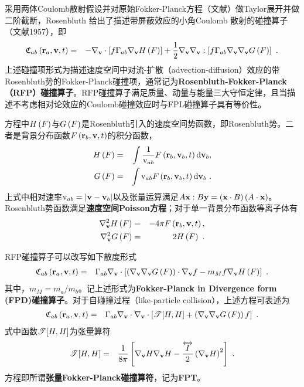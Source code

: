   采用两体Coulomb散射假设并对原始Fokker-Planck方程（文献）做Taylor展开并做二阶截断，Rosenbluth 给出了描述带屏蔽效应的小角Coulomb 散射的碰撞算子（文献1957），即
  \begin{eqnarray}
      \mathfrak{C}_{ab}  \left(\mathbf{r}_a,\mathbf{v},t \right) &=& - \nabla_{\mathbf{v}} \cdot \left[f \Gamma_{ab} \nabla_{\mathbf{v}} H \left(F \right) \right] + \frac{1}{2} \nabla_{\mathbf{v}} \nabla_{\mathbf{v}} : \left[f \Gamma_{ab} \nabla_{\mathbf{v}} \nabla_{\mathbf{v}} G \left(F \right) \right] ~. \label{RFP}
  \end{eqnarray}
  上述碰撞项形式为描述速度空间中对流-扩散（advection-diffusion）效应的带Rosenbluth势的Fokker-Planck碰撞项，通常记为\textbf{Rosenbluth-Fokker-Planck（RFP）碰撞算子}。RFP碰撞算子满足质量、动量与能量三大守恒定律\cite{Liboff1967}，且当描述不考虑相对论效应\cite{Braams1987}的Coulomb碰撞效应\cite{Arsen'ev1991,DEGOND1992}时与FPL碰撞算子具有等价性\cite{Hazeltine2018}。
  
  方程中$H \left(F \right) $与$G \left(F \right)$是Rosenbluth引入的速度空间势函数，即Rosenbluth势。二者是背景分布函数$F \left(\mathbf{r}_b,\mathbf{v},t \right)$的积分函数，
  \begin{eqnarray}
    H \left(F \right) &=& \int \frac{1}{\mathrm{v}_{ab}} F\left(\mathbf{r}_b,\mathbf{v}_b,t \right) \mathrm{d} \mathbf{v} _b, \\
    G \left(F \right) &=& \int \mathrm{v}_{ab} F\left(\mathbf{r}_b,\mathbf{v}_b,t \right) \mathrm{d} \mathbf{v} _b ~. \label{HG}
  \end{eqnarray}
  上式中相对速率$\mathrm{v}_{ab}=\left|\mathbf{v}-\mathbf{v}_b \right|$以及张量运算满足$A\mathbf{x}:B\mathbf{y}=\left(\mathbf{x} \cdot B \right)\left(A \cdot \mathbf{x} \right)$。
  Rosenbluth势函数满足\textbf{速度空间Poisson方程}；对于单一背景分布函数等离子体有
  \begin{eqnarray}
      \nabla{_{\mathbf{v}}^2} H \left(F \right) &=& - 4 \pi F\left(\mathbf{r}_b,\mathbf{v},t \right), \\
      \nabla{_{\mathbf{v}}^2} G \left(F \right) &=& 2 H \left(F \right) ~. \label{possionHG}
  \end{eqnarray}

  RFP碰撞算子可以改写如下散度形式
  \begin{eqnarray}
      \mathfrak{C}_{ab} \left(\mathbf{r}_a,\mathbf{v},t \right) &=& \Gamma_{ab} \nabla_{\mathbf{v}} \cdot \left[\left(\nabla_{\mathbf{v}} \nabla_{\mathbf{v}} G \left(F \right) \right) \cdot \nabla_{\mathbf{v}} f - m_M f \nabla_{\mathbf{v}} H \left(F \right) \right]  ~. \label{FPD}
  \end{eqnarray}
  其中，$m_M=m_a/m_b$。记上述形式为\textbf{Fokker-Planck in Divergence form (FPD)碰撞算子}。对于自碰撞过程（like-particle collision），上述方程可表述为\cite{Chacon2000}
  \begin{eqnarray}
      \mathfrak{C}_{ab} \left(\mathbf{r}_a,\mathbf{v},t \right) &=& \Gamma_{ab} \nabla_{\mathbf{v}} \cdot \nabla_{\mathbf{v}} \cdot \left[\mathscr{T}[H,H] + \left(\nabla_{\mathbf{v}} \nabla_{\mathbf{v}} G \left(F \right) \right) f \right]  ~. \label{FPT}
  \end{eqnarray}
  式中函数$\mathscr{T}[H,H]$为张量算符\cite{Chacon2000}
  \begin{eqnarray}
      \mathscr{T}[H,H] &=& \frac{1}{8 \pi} \left[\nabla_{\mathbf{v}} H \nabla_{\mathbf{v}} H - \frac{\overleftrightarrow{I}}{2} \left(\nabla_{\mathbf{v}} H \right)^2 \right]  ~. \label{THH}
  \end{eqnarray}
  方程即所谓\textbf{张量Fokker-Planck碰撞算符}，记为\textbf{FPT}。

